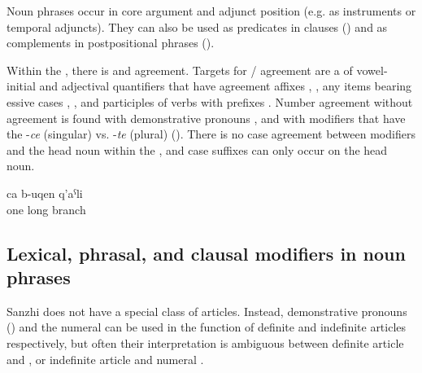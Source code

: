 Noun phrases occur in core argument and adjunct position (e.g. as instruments or temporal adjuncts). They can also be used as predicates in  clauses () and as complements in postpositional phrases ().

Within the , there is  and  agreement. Targets for \slash {} agreement are a  of vowel-initial   and adjectival quantifiers that have agreement affixes , , any items bearing essive cases , , and participles of verbs with  prefixes . Number agreement without  agreement is found with demonstrative pronouns , and with modifiers that have the  -\textit{ce} (singular)  vs. -\textit{te} (plural)  (). There is no case agreement between modifiers and the head noun within the , and case suffixes can only occur on the head noun.

\begin{exe}
	\ex	\label{ex:a/one long branch@1}
	\gll	ca	b-uqen	q'aˁli\\
		one	long	branch\\
	\glt	{}
\end{exe}



\subsection{Lexical, phrasal, and clausal modifiers in noun phrases}
\label{ssec:Lexical, phrasal, and clausal modifiers in noun phrases}

Sanzhi does not have a special class of articles. Instead, demonstrative pronouns () and the numeral   can be used in the function of definite and indefinite articles respectively, but often their interpretation is ambiguous between definite article and , or indefinite article and numeral .

